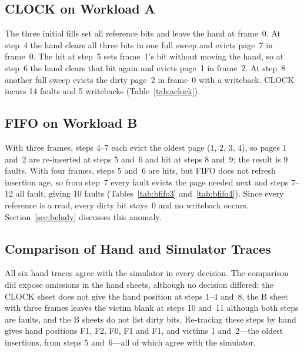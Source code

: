 \documentclass[conference,a4paper]{IEEEtran}
\begin{document}
\subsection{CLOCK on Workload A}
The three initial fills set all reference bits and leave the hand at frame~0. At step~4 the hand clears all three bits in one full sweep and evicts page~7 in frame~0. The hit at step~5 sets frame~1's bit without moving the hand, so at step~6 the hand clears that bit again and evicts page~1 in frame~2. At step~8 another full sweep evicts the dirty page~2 in frame~0 with a writeback. CLOCK incurs 14 faults and 5 writebacks (Table~\ref{tab:aclock}).




\subsection{FIFO on Workload B}
With three frames, steps 4--7 each evict the oldest page (1, 2, 3, 4), so pages 1 and~2 are re-inserted at steps 5 and~6 and hit at steps 8 and~9; the result is 9 faults. With four frames, steps 5 and~6 are hits, but FIFO does not refresh insertion age, so from step~7 every fault evicts the page needed next and steps 7--12 all fault, giving 10 faults (Tables~\ref{tab:bfifo3} and~\ref{tab:bfifo4}). Since every reference is a read, every dirty bit stays~0 and no writeback occurs. Section~\ref{sec:belady} discusses this anomaly.

\subsection{Comparison of Hand and Simulator Traces}
All six hand traces agree with the simulator in every decision. The comparison did expose omissions in the hand sheets, although no decision differed: the CLOCK sheet does not give the hand position at steps 1--4 and~8, the B sheet with three frames leaves the victim blank at steps 10 and~11 although both steps are faults, and the B sheets do not list dirty bits. Re-tracing these steps by hand gives hand positions F1, F2, F0, F1 and F1, and victims 1 and~2---the oldest insertions, from steps 5 and~6---all of which agree with the simulator.
\end{document}
